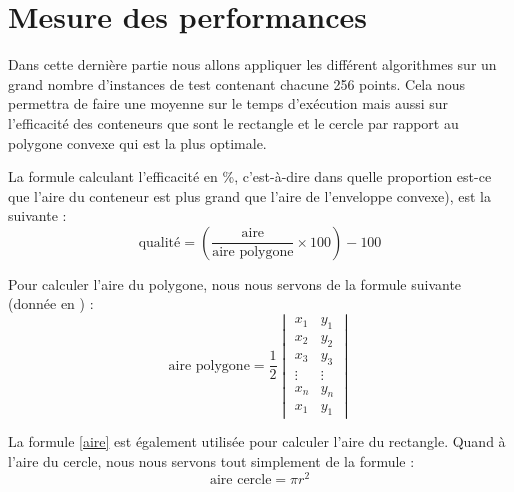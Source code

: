\section{Mesure des performances}
\label{efficacite}
Dans cette dernière partie nous allons appliquer les différent algorithmes sur un grand nombre d'instances de test contenant chacune 256 points. Cela nous permettra de faire une moyenne sur le temps d'exécution mais aussi sur l'efficacité des conteneurs que sont le rectangle et le cercle par rapport au polygone convexe qui est la plus optimale.

La formule calculant l'efficacité en \%, c'est-à-dire dans quelle proportion est-ce que l'aire du conteneur est plus grand que l'aire de l'enveloppe convexe), est la suivante :
\begin{equation}
\textrm{qualité} = \left( \frac{\textrm{aire}}{\textrm{aire polygone}} \times 100\right) - 100
\end{equation}

Pour calculer l'aire du polygone, nous nous servons de la formule suivante (donnée en \cite{mathwords}) :
\begin{equation}
\textrm{aire polygone} = \frac{1}{2} \begin{vmatrix}
x_1 & y_1 \\
x_2 & y_2 \\
x_3 & y_3 \\
\vdots & \vdots \\
x_n & y_n \\
x_1 & y_1
\end{vmatrix}
\label{aire}
\end{equation}

La formule \eqref{aire} est également utilisée pour calculer l'aire du rectangle. Quand à l'aire du cercle, nous nous servons tout simplement de la formule :
\begin{equation}
\textrm{aire cercle} = \pi r^2
\end{equation}

